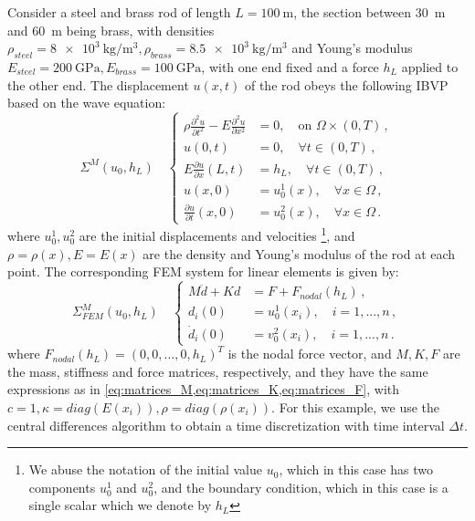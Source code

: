 \documentclass[letterpaper, 10 pt, conference]{ieeeconf/ieeeconf}
\begin{document}
Consider a steel and brass rod of length $L = \SI{100}{\m}$, the section between 
\SI{30}{\m} and \SI{60}{\m} being brass, with densities $\rho_{steel} =
\SI{8e3}{\kg\per\m^3}, \rho_{brass} = \SI{8.5e3}{\kg\per\m^3}$ and Young's
modulus $E_{steel} = \SI{200}{\giga\pascal}, E_{brass} =
\SI{100}{\giga\pascal}$,
with one end fixed and a force $h_L$ applied to the
other end. The displacement $u(x, t)$ of the rod obeys the following
IBVP based on the wave equation:
%
\begin{equation}\label{eq:pde_mech}
    \Sigma^{M}(u_0, h_L) \quad \left \{
    \begin{aligned}
        \rho \frac{\partial^2 u}{\partial t^2} - E \frac{\partial^2
        u}{\partial x^2} &= 0, \quad \text{on } \Omega \times (0, T) \,, \\
        u(0, t) &= 0, \quad \forall t \in (0, T) \,, \\
        E \frac{\partial u}{\partial x}(L, t) &= h_L, \quad 
        \forall t \in (0, T) \,, \\
        u(x, 0) &= u_0^1(x), \quad \forall x \in \Omega \,, \\
        \frac{\partial u}{\partial t}(x, 0) &= u_0^2(x), \quad \forall x \in \Omega \,.
    \end{aligned}
    \right.
\end{equation}
%
where $u_0^1, u_0^2$ are the initial displacements and velocities
\footnote{We abuse the notation of the initial value $u_0$, which in this
case has two components $u_0^1$ and $u_0^2$, and the boundary condition, which
in this case is a single scalar which we denote by $h_L$}, and $\rho =
\rho(x), E = E(x)$ are
the density and Young's modulus of the rod at each point.
The corresponding FEM system for linear elements is given by:
%
\begin{equation}\label{eq:fem_mech}
    \Sigma^M_{FEM}(u_0, h_L) \quad \left \{
    \begin{aligned}
        M\ddot{d} + K d &= F + F_{nodal}(h_L) \,, \\
        d_i(0) &= u_0^1(x_i), \quad i = 1,...,n \,, \\
        \dot{d}_i(0) &= v_0^2(x_i), \quad i = 1,...,n \,.
    \end{aligned}
    \right.
\end{equation}
%
where $F_{nodal}(h_L) = (0, 0, ..., 0, h_L)^T$ is the nodal force vector, and $M, K, F$ 
are the mass, stiffness and force matrices, respectively, and
they have the same expressions as in
\cref{eq:matrices_M,eq:matrices_K,eq:matrices_F}, with $c = 1, \kappa =
diag(E(x_i)), \rho = diag(\rho(x_i))$.
For this example, we use the central differences algorithm
\cite{hughes_finite_2000} to obtain a time
discretization with time interval $\Delta t$. 
\end{document}
